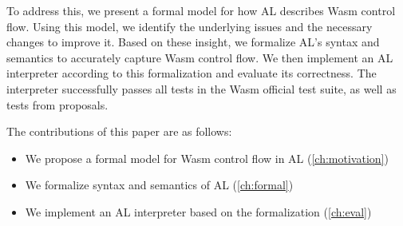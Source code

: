 To address this, we present a formal model for how AL describes Wasm control flow.
Using this model, we identify the underlying issues and the necessary changes
to improve it.
Based on these insight, we formalize AL's syntax and semantics to accurately
capture Wasm control flow.
We then implement an AL interpreter according to this formalization and
evaluate its correctness.
The interpreter successfully passes all tests in the Wasm official test suite,
as well as tests from proposals.


The contributions of this paper are as follows:
\begin{itemize}
  \item We propose a formal model for Wasm control flow in AL (\cref{ch:motivation})
  \item We formalize syntax and semantics of AL (\cref{ch:formal})
  \item We implement an AL interpreter based on the formalization (\cref{ch:eval})
\end{itemize}
